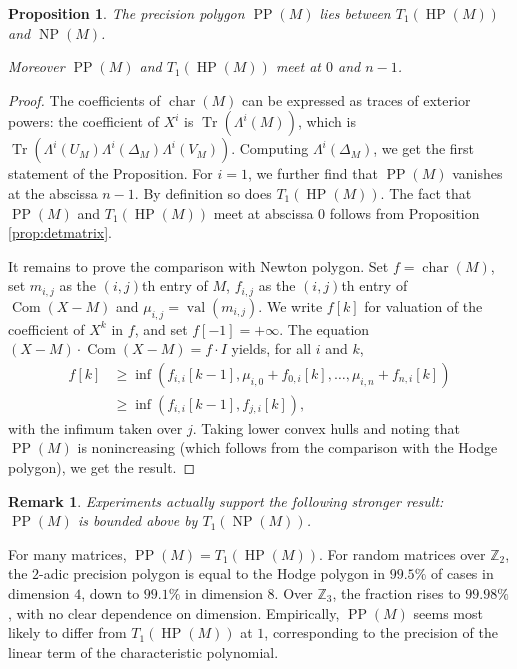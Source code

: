 \documentclass{sig-alternate}
\DeclareMathOperator{\NP}{NP}
\DeclareMathOperator{\HP}{HP}
\DeclareMathOperator{\PP}{PP}
\DeclareMathOperator{\val}{val}
\DeclareMathOperator{\tr}{Tr}
\DeclareMathOperator{\com}{Com}
\newtheorem{prop}[theo]{Proposition}
\newtheorem{rem}[theo]{Remark}
\newcommand{\Z}{\mathbb Z}
\DeclareMathOperator{\charpoly}{char}
\begin{document}
\begin{prop} \label{prop:polygons}
The precision polygon $\PP(M)$ lies between $T_1(\HP(M))$
and $\NP(M)$.

Moreover $\PP(M)$ and $T_1(\HP(M))$ meet at $0$ and $n{-}1$.
\end{prop}

\begin{proof}
The coefficients of $\charpoly(M)$ can be expressed as traces of 
exterior powers: the coefficient of $X^i$ is $\tr(\Lambda^i(M))$,
which is $\tr(\Lambda^i(U_M) \Lambda^i(\Delta_M) \Lambda^i(V_M))$.  
Computing $\Lambda^i(\Delta_M)$, we get the first statement of
the Proposition. For $i = 1$, we further find that $\PP(M)$ vanishes
at the abscissa $n{-}1$. By definition so does $T_1(\HP(M))$. The fact 
that $\PP(M)$ and $T_1(\HP(M))$ meet at abscissa $0$ follows from
Proposition \ref{prop:detmatrix}.

It remains to prove the comparison with Newton polygon.
Set $f = \charpoly(M)$, set $m_{i,j}$ as the $(i,j)$th entry of $M$, 
$f_{i,j}$ as the $(i,j)$th entry of $\com(X{-}M)$ and $\mu_{i,j} = 
\val(m_{i,j})$. We write $f[k]$ 
for valuation of the coefficient of $X^k$ in $f$, and set $f[-1] = 
+\infty$. The equation $(X{-}M) \cdot \com(X{-}M) = f \cdot I$ yields, 
for all $i$ and $k$,
\begin{align*}
f[k] &\ge \inf(f_{i,i}[k{-}1], \mu_{i,0} + f_{0,i}[k], \ldots, 
\mu_{i,n} + f_{n,i}[k]) \\
&\ge \inf(f_{i,i}[k{-}1], f_{j,i}[k]),
\end{align*}
with the infimum taken over $j$. 
Taking lower convex hulls and noting that $\PP(M)$ is nonincreasing
(which follows from the comparison with the Hodge polygon), we get the 
result.
\end{proof}

\begin{rem}
Experiments actually support the following stronger result: $\PP(M)$ is 
bounded above by $T_1(\NP(M))$.
\end{rem}

For many matrices, $\PP(M) = T_1(\HP(M))$.  For random matrices over 
$\Z_2$, the $2$-adic precision polygon is equal to the Hodge polygon in 
$99.5\%$ of cases in dimension $4$, down to $99.1\%$ in dimension $8$.  
Over $\Z_3$, the fraction rises to $99.98\%$, with no clear dependence on 
dimension.
Empirically, $\PP(M)$ seems most likely to differ from $T_1(\HP(M))$ at 
$1$, corresponding to the precision of the linear term of the 
characteristic polynomial.
\end{document}
